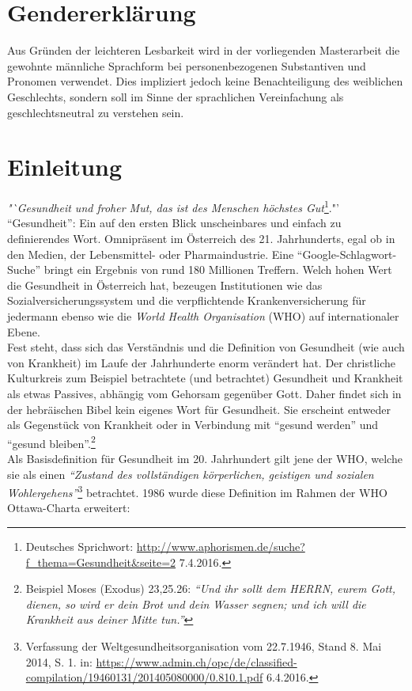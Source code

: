 \documentclass[
    a4paper,
    12pt,
    hyphens,
    chapterprefix=true,
    headheight=33pt,
    footheight=29pt,
    headings=optiontohead,
]{scrartcl}
\begin{document}
\section{Gendererklärung}
Aus Gründen der leichteren Lesbarkeit wird in der vorliegenden Masterarbeit die gewohnte männliche Sprachform bei personenbezogenen Substantiven und Pronomen verwendet. Dies impliziert jedoch keine Benachteiligung des weiblichen Geschlechts, sondern soll im Sinne der sprachlichen Vereinfachung als geschlechtsneutral zu verstehen sein.
\newpage


\section{Einleitung}

\textit{"`Gesundheit und froher Mut, das ist des Menschen höchstes Gut}\footnote{Deutsches Sprichwort: \url{http://www.aphorismen.de/suche?f_thema=Gesundheit&seite=2} 7.4.2016.}."'\\ "`Gesundheit"': Ein auf den ersten Blick unscheinbares und einfach zu definierendes Wort.
Omnipräsent im Österreich des 21. Jahrhunderts, egal ob in den Medien, der Lebensmittel- oder Pharmaindustrie. Eine "`Google-Schlagwort-Suche"' bringt ein Ergebnis von rund 180 Millionen Treffern. Welch hohen Wert die Gesundheit in Österreich hat, bezeugen Institutionen wie das Sozialversicherungssystem und die verpflichtende
Krankenversicherung für jedermann ebenso wie die \textit{World Health Organisation} (WHO) auf internationaler Ebene.\\
Fest steht, dass sich das Verständnis und die Definition von Gesundheit (wie auch von Krankheit) im Laufe der Jahrhunderte enorm verändert hat. Der christliche Kulturkreis zum Beispiel betrachtete (und betrachtet) Gesundheit und Krankheit als etwas Passives, abhängig vom Gehorsam gegenüber Gott. Daher findet sich in der hebräischen Bibel kein eigenes Wort für Gesundheit. Sie erscheint entweder als Gegenstück von Krankheit oder in Verbindung mit "`gesund werden"' und "`gesund bleiben"'.\footnote{Beispiel Moses (Exodus) 23,25.26: \textit{"`Und ihr sollt dem HERRN, eurem Gott, dienen, so wird er dein Brot und dein Wasser segnen; und ich will die Krankheit aus deiner Mitte tun."'}} \\
Als Basisdefinition für Gesundheit im 20. Jahrhundert gilt jene der WHO, welche sie als einen \textit{"`Zustand des vollständigen körperlichen, geistigen und sozialen Wohlergehens"'}\footnote{Verfassung der Weltgesundheitsorganisation vom 22.7.1946, Stand 8. Mai 2014,
S. 1. in: \url{https://www.admin.ch/opc/de/classified-compilation/19460131/201405080000/0.810.1.pdf} 6.4.2016.} betrachtet. 1986 wurde diese Definition im Rahmen der WHO Ottawa-Charta erweitert:\\
\end{document}
